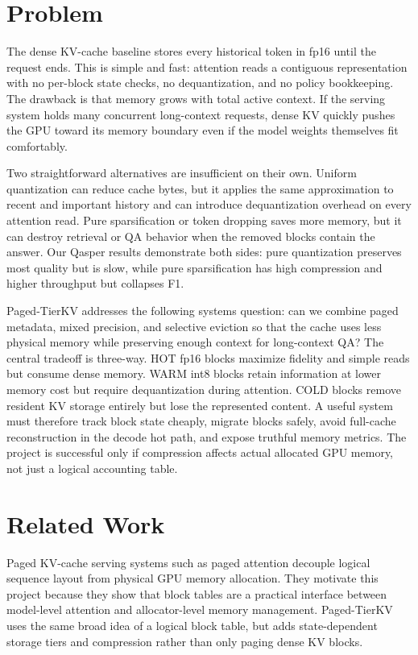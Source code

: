 \documentclass{article}
\begin{document}
\section{Problem}

The dense KV-cache baseline stores every historical token in fp16 until the request ends. This is simple and fast: attention reads a contiguous representation with no per-block state checks, no dequantization, and no policy bookkeeping. The drawback is that memory grows with total active context. If the serving system holds many concurrent long-context requests, dense KV quickly pushes the GPU toward its memory boundary even if the model weights themselves fit comfortably.

Two straightforward alternatives are insufficient on their own. Uniform quantization can reduce cache bytes, but it applies the same approximation to recent and important history and can introduce dequantization overhead on every attention read. Pure sparsification or token dropping saves more memory, but it can destroy retrieval or QA behavior when the removed blocks contain the answer. Our Qasper results demonstrate both sides: pure quantization preserves most quality but is slow, while pure sparsification has high compression and higher throughput but collapses F1.

Paged-TierKV addresses the following systems question: can we combine paged metadata, mixed precision, and selective eviction so that the cache uses less physical memory while preserving enough context for long-context QA? The central tradeoff is three-way. HOT fp16 blocks maximize fidelity and simple reads but consume dense memory. WARM int8 blocks retain information at lower memory cost but require dequantization during attention. COLD blocks remove resident KV storage entirely but lose the represented content. A useful system must therefore track block state cheaply, migrate blocks safely, avoid full-cache reconstruction in the decode hot path, and expose truthful memory metrics. The project is successful only if compression affects actual allocated GPU memory, not just a logical accounting table.
\section{Related Work}

Paged KV-cache serving systems such as paged attention \citep{kwon2023efficient} decouple logical sequence layout from physical GPU memory allocation. They motivate this project because they show that block tables are a practical interface between model-level attention and allocator-level memory management. Paged-TierKV uses the same broad idea of a logical block table, but adds state-dependent storage tiers and compression rather than only paging dense KV blocks.
\end{document}
